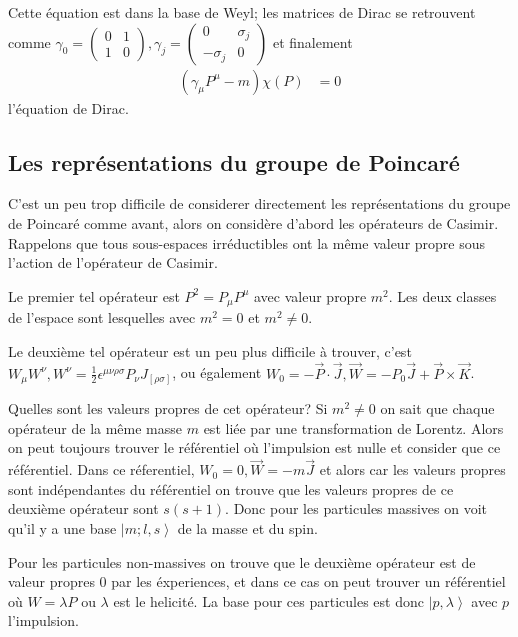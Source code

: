 \documentclass[10pt]{report}
\newcommand{\ket}[1]{\left|#1\right>}
\begin{document}
Cette \'equation est dans la base de Weyl; les matrices de Dirac se retrouvent comme $\gamma_0 = \begin{pmatrix} 0&1\\1&0 \end{pmatrix} , \gamma_j = \begin{pmatrix} 0 & \sigma_j\\ - \sigma_j & 0 \end{pmatrix} $ et finalement 
\begin{align}
    (\gamma_\mu P^\mu - m) \chi(P) &= 0
\end{align}
l'\'equation de Dirac.

\subsection{Les repr\'esentations du groupe de Poincar\'e}

C'est un peu trop difficile de considerer directement les repr\'esentations du groupe de Poincar\'e comme avant, alors on consid\`ere d'abord les op\'erateurs de Casimir. Rappelons que tous sous-espaces irr\'eductibles ont la m\^eme valeur propre sous l'action de l'op\'erateur de Casimir.

Le premier tel op\'erateur est $P^2 = P_\mu P^\mu$ avec valeur propre $m^2$. Les deux classes de l'espace sont lesquelles avec $m^2 = 0$ et $m^2 \neq 0$.

Le deuxi\`eme tel op\'erateur est un peu plus difficile \`a trouver, c'est $W_\mu W^\nu, W^\nu = \frac{1}{2}\epsilon^{\mu \nu \rho \sigma}P_\nu J_{[\rho \sigma]}$, ou \'egalement $W_0 = -\vec{P} \cdot \vec{J}, \vec{W} = -P_0\vec{J} + \vec{P} \times \vec{K}$.

Quelles sont les valeurs propres de cet op\'erateur? Si $m^2 \neq 0$ on sait que chaque op\'erateur de la m\^eme masse $m$ est li\'ee par une transformation de Lorentz. Alors on peut toujours trouver le r\'ef\'erentiel o\`u l'impulsion est nulle et consider que ce r\'ef\'erentiel. Dans ce r\'eferentiel, $W_0 = 0, \vec{W} = -m\vec{J}$ et alors car les valeurs propres sont ind\'ependantes du r\'ef\'erentiel on trouve que les valeurs propres de ce deuxi\`eme op\'erateur sont $s(s+1)$. Donc pour les particules massives on voit qu'il y a une base $\ket{m; l, s}$ de la masse et du spin.

Pour les particules non-massives on trouve que le deuxi\`eme op\'erateur est de valeur propres $0$ par les \'experiences, et dans ce cas on peut trouver un r\'ef\'erentiel o\`u $W = \lambda P$ ou $\lambda$ est le helicit\'e. La base pour ces particules est donc $\ket{p, \lambda}$ avec $p$ l'impulsion.
\end{document}
